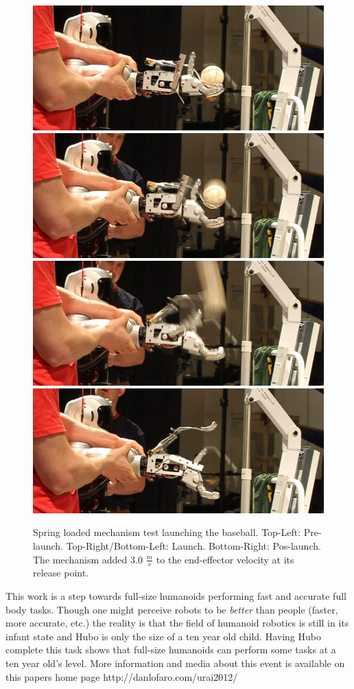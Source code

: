 \begin{figure}[t]
  \centering
  
\includegraphics[width=0.5\columnwidth]{./pix/arm0.png}\includegraphics[width=0.5\columnwidth]{./pix/arm1.png}
\includegraphics[width=0.5\columnwidth]{./pix/arm2.png}\includegraphics[width=0.5\columnwidth]{./pix/arm3.png}
  \caption{Spring loaded mechanism test launching the baseball.  Top-Left: Pre-launch.  Top-Right/Bottom-Left: Launch.  Bottom-Right: Pos-launch.  The mechanism added 3.0 $\frac{m}{s}$ to the end-effector velocity at its release point.}
  \label{fig:hubo-spring}
\end{figure}

This work is a step towards full-size humanoids performing fast and accurate full body tasks.
Though one might perceive robots to be \textit{better} than people (faster, more accurate, etc.) the reality is that the field of humanoid robotics is still in its infant state and Hubo is only the size of a ten year old child.
Having Hubo complete this task shows that full-size humanoids can perform some tasks at a ten year old's level.
More information and media about this event is available on this papers home page http://danlofaro.com/urai2012/













